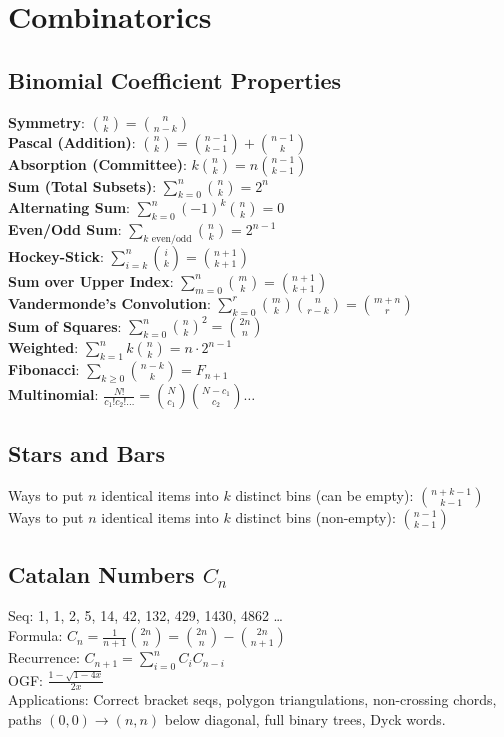 \section{Combinatorics}
\subsection{Binomial Coefficient Properties}
\textbf{Symmetry}: $\binom{n}{k} = \binom{n}{n-k}$ \\
\textbf{Pascal (Addition)}: $\binom{n}{k} = \binom{n-1}{k-1} + \binom{n-1}{k}$ \\
\textbf{Absorption (Committee)}: $k\binom{n}{k} = n\binom{n-1}{k-1}$ \\
\textbf{Sum (Total Subsets)}: $\sum_{k=0}^n \binom{n}{k} = 2^n$ \\
\textbf{Alternating Sum}: $\sum_{k=0}^n (-1)^k \binom{n}{k} = 0$ \\
\textbf{Even/Odd Sum}: $\sum_{k\text{ even/odd}} \binom{n}{k} = 2^{n-1}$ \\
\textbf{Hockey-Stick}: $\sum_{i=k}^n \binom{i}{k} = \binom{n+1}{k+1}$ \\
\textbf{Sum over Upper Index}: $\sum_{m=0}^n \binom{m}{k} = \binom{n+1}{k+1}$ \\
\textbf{Vandermonde's Convolution}: $\sum_{k=0}^r \binom{m}{k} \binom{n}{r-k} = \binom{m+n}{r}$ \\
\textbf{Sum of Squares}: $\sum_{k=0}^n \binom{n}{k}^2 = \binom{2n}{n}$ \\
\textbf{Weighted}: $\sum_{k=1}^n k\binom{n}{k} = n \cdot 2^{n-1}$ \\
\textbf{Fibonacci}: $\sum_{k \ge 0} \binom{n-k}{k} = F_{n+1}$ \\
\textbf{Multinomial}: $\frac{N!}{c_1! c_2! \dots} = \binom{N}{c_1}\binom{N-c_1}{c_2}\dots$

\subsection{Stars and Bars}
\textbullet{} Ways to put $n$ identical items into $k$ distinct bins (can be empty): $\binom{n+k-1}{k-1}$ \\
\textbullet{} Ways to put $n$ identical items into $k$ distinct bins (non-empty): $\binom{n-1}{k-1}$

\subsection{Catalan Numbers $C_n$}
Seq: 1, 1, 2, 5, 14, 42, 132, 429, 1430, 4862 \dots \\
\textbullet{} Formula: $C_n = \frac{1}{n+1} \binom{2n}{n} = \binom{2n}{n} - \binom{2n}{n+1}$ \\
\textbullet{} Recurrence: $C_{n+1} = \sum_{i=0}^n C_i C_{n-i}$ \\
\textbullet{} OGF: $\frac{1-\sqrt{1-4x}}{2x}$ \\
\textbullet{} Applications: Correct bracket seqs, polygon triangulations,
non-crossing chords, paths $(0,0) \to (n,n)$ below diagonal,
full binary trees, Dyck words.

